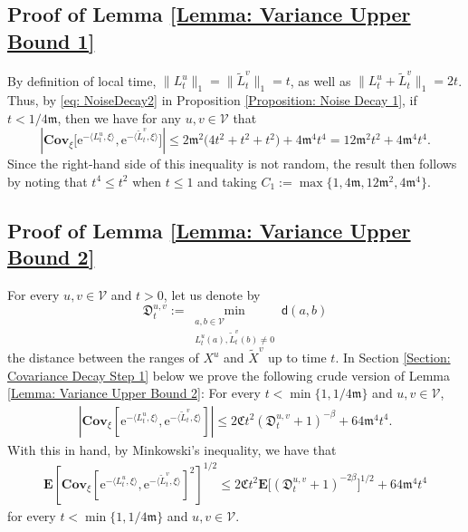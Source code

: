 \documentclass{amsart}
\numberwithin{equation}{section}
\theoremstyle{definition}
\newcommand\be{\beta}
\newcommand\mbf{\mathbf}
\newcommand\mf{\mathfrak}
\newcommand\mr{\mathrm}
\newcommand\ms{\mathscr}
\newcommand\msf{\mathsf}
\begin{document}
\subsection{Proof of Lemma \ref{Lemma: Variance Upper Bound 1}}
\label{sec:PrLem1}

%
By definition of local time, $\|L_t^u\|_{1}=\|\tilde{L}_t^v\|_{1}= t$,
as well as $\|L_t^u+\tilde{L}_t^v\|_{1}=2t$.
Thus, by \eqref{eq: NoiseDecay2} in Proposition \ref{Proposition: Noise Decay 1}, if $t<1/4\mf m$, then
we have for any $u,v\in \ms V$ that
\[
		\left|\mbf{Cov}_{\xi}\big[\mr e^{-\langle L^u_t,\xi\rangle},\mr e^{-\langle\tilde L^v_t,\xi\rangle}\big]\right|\leq2\mf m^2\big(4t^2+t^2+t^2\big)+4\mf m^4t^4=12\mf m^2t^2+4\mf m^4t^4.
\] 
Since the right-hand side of this inequality is not random, the result then follows
by noting that $t^4\leq t^2$ when $t\leq1$ and taking $C_1:=\max\{1,4\mf m,12\mf m^2,4\mf m^4\}$.


%

\subsection{Proof of Lemma \ref{Lemma: Variance Upper Bound 2}}
\label{sec:PrLem2}

%

For every $u,v\in\ms V$ and $t>0$, let us denote by
\[\mf D^{u,v}_t:=\min_{\substack{a,b\in\ms V\\L_t^u(a),\tilde L_t^v(b)\neq0}}\msf d(a,b)\]
the distance between the ranges of $X^u$ and $\tilde X^v$ up to time $t$.
In Section \ref{Section: Covariance Decay Step 1} below we prove the following crude version of Lemma \ref{Lemma: Variance Upper Bound 2}:
For every $t<\min\{1,1/4\mf m\}$ and $u,v\in\ms V$,
\begin{align}
\label{Equation: covariance decay}
\left|\mbf{Cov}_\xi\left[\mr e^{-\langle L_t^u,\xi\rangle},\mr e^{-\langle\tilde L_t^v,\xi\rangle}\right]\right|\leq 2\mf Ct^2(\mf D_t^{u,v}+1)^{-\be}+64\mf m^4t^4.
\end{align}
With this in hand, by Minkowski's inequality, we have that
\begin{align}
\label{Equation: PrLem2 - 1}
\mbf E\left[\mbf{Cov}_\xi\left[\mr e^{-\langle L_t^u,\xi\rangle},\mr e^{-\langle\tilde L_t^v,\xi\rangle}\right]^2\right]^{1/2}\leq
2\mf Ct^2\mbf E\big[(\mf D_t^{u,v}+1)^{-2\be}\big]^{1/2}+64\mf m^4t^4
\end{align}
for every $t<\min\{1,1/4\mf m\}$ and $u,v\in\ms V$.

%
\end{document}
